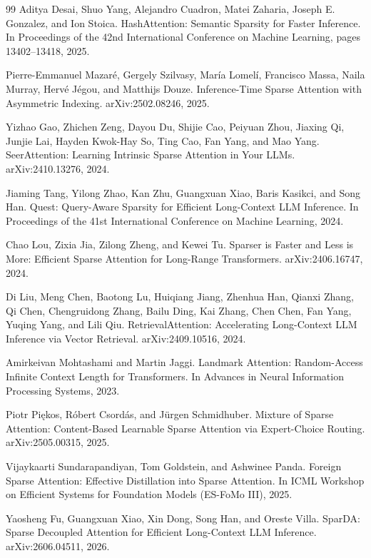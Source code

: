\documentclass{article}
\begin{document}
\begin{thebibliography}{99}
Aditya Desai, Shuo Yang, Alejandro Cuadron, Matei Zaharia, Joseph E. Gonzalez, and Ion Stoica.
HashAttention: Semantic Sparsity for Faster Inference.
In Proceedings of the 42nd International Conference on Machine Learning, pages 13402--13418, 2025.

Pierre-Emmanuel Mazar\'e, Gergely Szilvasy, Mar\'ia Lomel\'i, Francisco Massa, Naila Murray, Herv\'e J\'egou, and Matthijs Douze.
Inference-Time Sparse Attention with Asymmetric Indexing.
arXiv:2502.08246, 2025.

Yizhao Gao, Zhichen Zeng, Dayou Du, Shijie Cao, Peiyuan Zhou, Jiaxing Qi, Junjie Lai, Hayden Kwok-Hay So, Ting Cao, Fan Yang, and Mao Yang.
SeerAttention: Learning Intrinsic Sparse Attention in Your LLMs.
arXiv:2410.13276, 2024.

Jiaming Tang, Yilong Zhao, Kan Zhu, Guangxuan Xiao, Baris Kasikci, and Song Han.
Quest: Query-Aware Sparsity for Efficient Long-Context LLM Inference.
In Proceedings of the 41st International Conference on Machine Learning, 2024.

Chao Lou, Zixia Jia, Zilong Zheng, and Kewei Tu.
Sparser is Faster and Less is More: Efficient Sparse Attention for Long-Range Transformers.
arXiv:2406.16747, 2024.

Di Liu, Meng Chen, Baotong Lu, Huiqiang Jiang, Zhenhua Han, Qianxi Zhang, Qi Chen, Chengruidong Zhang, Bailu Ding, Kai Zhang, Chen Chen, Fan Yang, Yuqing Yang, and Lili Qiu.
RetrievalAttention: Accelerating Long-Context LLM Inference via Vector Retrieval.
arXiv:2409.10516, 2024.

Amirkeivan Mohtashami and Martin Jaggi.
Landmark Attention: Random-Access Infinite Context Length for Transformers.
In Advances in Neural Information Processing Systems, 2023.

Piotr Pi\k{e}kos, R\'obert Csord\'as, and J\"urgen Schmidhuber.
Mixture of Sparse Attention: Content-Based Learnable Sparse Attention via Expert-Choice Routing.
arXiv:2505.00315, 2025.

Vijaykaarti Sundarapandiyan, Tom Goldstein, and Ashwinee Panda.
Foreign Sparse Attention: Effective Distillation into Sparse Attention.
In ICML Workshop on Efficient Systems for Foundation Models (ES-FoMo III), 2025.

Yaosheng Fu, Guangxuan Xiao, Xin Dong, Song Han, and Oreste Villa.
SparDA: Sparse Decoupled Attention for Efficient Long-Context LLM Inference.
arXiv:2606.04511, 2026.

\end{thebibliography}
\end{document}
